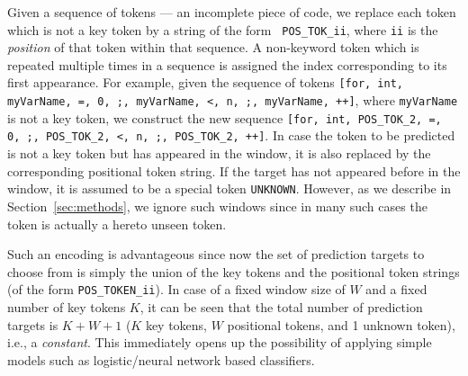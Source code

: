 Given a sequence of tokens --- an incomplete piece of code, we replace each
token which is not a key token by a string of the form {\tt
POS\_TOK\_ii}, where {\tt ii} is the {\it position} of that token
within that sequence. A non-keyword token which is repeated multiple times in a
sequence is assigned the index corresponding to its first appearance. For
example, given the sequence of tokens {\tt[for, int, myVarName, =, 0, ;,
myVarName, <, n, ;, myVarName, ++]}, where {\tt myVarName} is not a key token,
we construct the new sequence {\tt[for, int, POS\_TOK\_2, =, 0, ;, POS\_TOK\_2,
<, n, ;, POS\_TOK\_2, ++]}. In case the token to be predicted is not a key token
but has appeared in the window, it is also replaced by the corresponding
positional token string. If the target has not appeared before in the window, it
is assumed to be a special token {\tt UNKNOWN}. However, as we describe in
Section~\ref{sec:methods}, we ignore such windows since in many such
cases the token is actually a hereto unseen token.

Such an encoding is advantageous since now the set of prediction targets to
choose from is simply the union of the key tokens and the positional token
strings (of the form {\tt POS\_TOKEN\_ii}). In case of a fixed window size of
$W$ and a fixed number of key tokens $K$, it can be seen that the total number
of prediction targets is $K+W+1$ ($K$ key tokens, $W$ positional tokens, and 1
unknown token), i.e., a {\it constant}. This immediately opens up the
possibility of applying simple models such as logistic/neural network based
classifiers.

